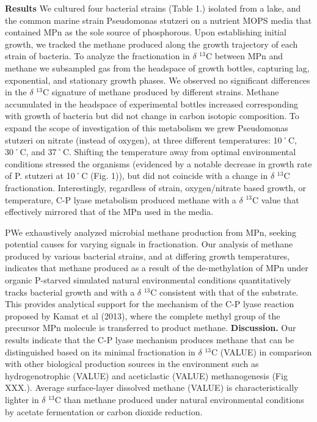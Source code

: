 \documentclass{nature}
\begin{document}
\textbf{Results} We cultured four bacterial strains (Table 1.) isolated from a lake, and the common marine strain Pseudomonas stutzeri on a nutrient MOPS media that contained MPn as the sole source of phosphorous. Upon establishing initial growth, we tracked the methane produced along the growth trajectory of each strain of bacteria. To analyze the fractionation in $\delta$ $^13$C between MPn and methane we subsampled gas from the headspace of growth bottles, capturing lag, exponential, and stationary growth phases. 
We observed no significant differences in the $\delta$ $^13$C signature of methane produced by different strains. Methane accumulated in the headspace of experimental bottles increased corresponding with growth of bacteria but did not change in carbon isotopic composition. To expand the scope of investigation of this metabolism we grew Pseudomonas stutzeri on nitrate (instead of oxygen), at three different temperatures: 10˚C, 30˚C, and 37˚C. Shifting the temperature away from optimal environmental conditions stressed the organisms (evidenced by a notable decrease in growth rate of P. stutzeri at 10˚C (Fig. 1)), but did not coincide with a change in  $\delta$ $^13$C fractionation. Interestingly, regardless of strain, oxygen/nitrate based growth, or temperature, C-P lyase metabolism produced methane with a $\delta$ $^13$C value that effectively mirrored that of the MPn used in the media. 

PWe exhaustively analyzed microbial methane production from MPn, seeking potential causes for varying signals in fractionation. Our analysis of methane produced by various bacterial strains, and at differing growth temperatures, indicates that methane produced as a result of the de-methylation of MPn under organic P-starved simulated natural environmental conditions quantitatively tracks bacterial growth and with a $\delta$ $^13$C consistent with that of the substrate. This provides analytical support for the mechanism of the C-P lyase reaction proposed by Kamat et al (2013), where the complete methyl group of the precursor MPn molecule is transferred to product methane. 
\textbf{Discussion.} Our results indicate that the C-P lyase mechanism produces methane that can be distinguished based on its minimal fractionation in $\delta$ $^13$C (VALUE) in comparison with other biological production sources in the environment such as hydrogenotrophic (VALUE) and aceticlastic (VALUE) methanogenesis (Fig XXX.). 
Average surface-layer dissolved methane (VALUE) is characteristically lighter in $\delta$ $^13$C than methane produced under natural environmental conditions by acetate fermentation or carbon dioxide reduction. 
 
\end{document}

